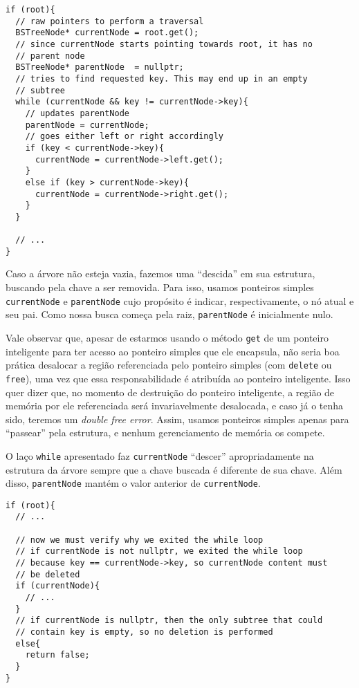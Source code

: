 \documentclass[11pt]{article}
\begin{document}
\begin{verbatim}
if (root){
  // raw pointers to perform a traversal
  BSTreeNode* currentNode = root.get();
  // since currentNode starts pointing towards root, it has no
  // parent node
  BSTreeNode* parentNode  = nullptr;
  // tries to find requested key. This may end up in an empty
  // subtree
  while (currentNode && key != currentNode->key){
    // updates parentNode
    parentNode = currentNode;
    // goes either left or right accordingly
    if (key < currentNode->key){
      currentNode = currentNode->left.get();
    }
    else if (key > currentNode->key){
      currentNode = currentNode->right.get();
    }
  }

  // ...
}
\end{verbatim}

Caso a árvore não esteja vazia, fazemos uma ``descida'' em sua
estrutura, buscando pela chave a ser removida.  Para isso, usamos
ponteiros simples \texttt{currentNode} e \texttt{parentNode} cujo propósito é
indicar, respectivamente, o nó atual e seu pai.  Como nossa busca
começa pela raiz, \texttt{parentNode} é inicialmente nulo.

Vale observar que, apesar de estarmos usando o método \texttt{get} de um
ponteiro inteligente para ter acesso ao ponteiro simples que ele
encapsula, não seria boa prática desalocar a região referenciada
pelo ponteiro simples (com \texttt{delete} ou \texttt{free}), uma vez que essa
responsabilidade é atribuída ao ponteiro inteligente. Isso quer
dizer que, no momento de destruição do ponteiro inteligente, a
região de memória por ele referenciada será invariavelmente
desalocada, e caso já o tenha sido, teremos um \emph{double free
error}.  Assim, usamos ponteiros simples apenas para ``passear''
pela estrutura, e nenhum gerenciamento de memória os compete.

O laço \texttt{while} apresentado faz \texttt{currentNode} ``descer''
apropriadamente na estrutura da árvore sempre que a chave buscada
é diferente de sua chave.  Além disso, \texttt{parentNode} mantém o valor
anterior de \texttt{currentNode}.

\begin{verbatim}
if (root){
  // ...

  // now we must verify why we exited the while loop
  // if currentNode is not nullptr, we exited the while loop
  // because key == currentNode->key, so currentNode content must
  // be deleted
  if (currentNode){
    // ...
  }
  // if currentNode is nullptr, then the only subtree that could
  // contain key is empty, so no deletion is performed
  else{
    return false;
  }
}
\end{verbatim}
\end{document}

